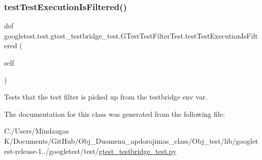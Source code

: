 \subsubsection{\texorpdfstring{testTestExecutionIsFiltered()}{testTestExecutionIsFiltered()}}
{\footnotesize\ttfamily def googletest.\+test.\+gtest\+\_\+testbridge\+\_\+test.\+G\+Test\+Test\+Filter\+Test.\+test\+Test\+Execution\+Is\+Filtered (\begin{DoxyParamCaption}\item[{}]{self }\end{DoxyParamCaption})}

\begin{DoxyVerb}Tests that the test filter is picked up from the testbridge env var.\end{DoxyVerb}
 

The documentation for this class was generated from the following file\+:\begin{DoxyCompactItemize}
\item 
C\+:/\+Users/\+Mindaugas K/\+Documents/\+Git\+Hub/\+Obj\+\_\+\+Duomenu\+\_\+apdorojimas\+\_\+class/\+Obj\+\_\+test/lib/googletest-\/release-\/1../googletest/test/\mbox{\hyperlink{_obj__test_2lib_2googletest-release-1_88_81_2googletest_2test_2gtest__testbridge__test_8py}{gtest\+\_\+testbridge\+\_\+test.\+py}}\end{DoxyCompactItemize}
